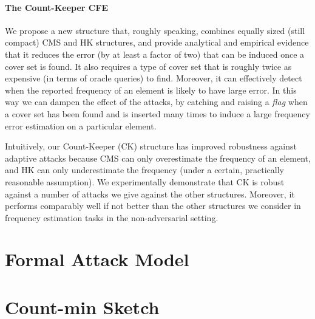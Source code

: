 \paragraph{The Count-Keeper CFE}

We propose a new structure that, roughly speaking, combines equally sized (still compact) CMS and HK structures, and provide analytical and empirical evidence that it reduces the error (by at least a factor of two) that can be induced once a cover set is found. It also requires a type of cover set that is roughly twice as expensive (in terms of oracle queries) to find. Moreover, it can effectively detect when the reported frequency of an element is likely to have large error. In this way we can dampen the effect of the attacks, by catching and raising a \emph{flag} when a cover set has been found and is inserted many times to induce a large frequency error estimation on a particular element.

Intuitively, our Count-Keeper (CK) structure has improved robustness against adaptive attacks because CMS can only overestimate the frequency of an element, and HK can only underestimate the frequency (under a certain, practically reasonable assumption). We experimentally demonstrate that CK is robust against a number of attacks we give against the other structures. Moreover, it performs comparably well if not better than the other structures we consider in frequency estimation tasks in the non-adversarial setting.


\section{Formal Attack Model}\label{sec:adv}



\section{Count-min Sketch}\label{sec:cms}
   
   

